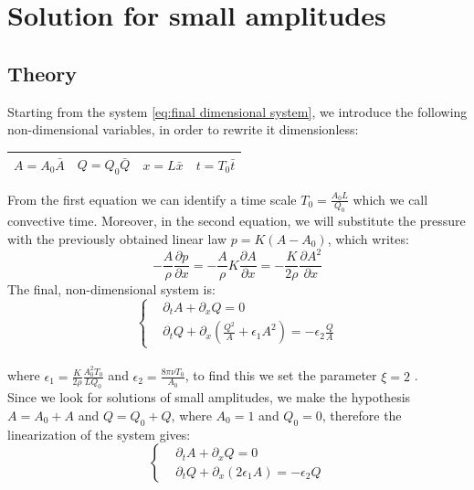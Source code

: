 \documentclass[12pt,a4paper]{article}
\numberwithin{equation}{section}
\begin{document}
\newpage

\section{Solution for small amplitudes}
\label{sec:solution for small amplitudes}
\subsection{Theory}
Starting from the system \ref{eq:final dimensional system}, we introduce the following non-dimensional variables, in order to rewrite it dimensionless:
\begin{center}
 \begin{tabular}{||c c c c||} 
 \hline
 $ A = A_0\bar{A}$ & $Q = Q_0\bar{Q}$ & $x = L\bar{x}$ & $ t = T_0\bar{t}$ \\ [0.5ex] 
 \hline
 \end{tabular}
\end{center}
From the first equation we can identify a time scale $T_0 = \frac{A_0 L}{Q_0}$ which we call convective time. Moreover, in the second equation, we will substitute the pressure with the previously obtained linear law $p = K(A-A_0)$, which writes:
\begin{equation*}
-\frac{A}{\rho}\frac{\partial p}{\partial x} = -\frac{A}{\rho}K\frac{\partial A}{\partial x} = -\frac{K}{2\rho}\frac{\partial A^2}{\partial x}
\end{equation*}
The final, non-dimensional system is:
\begin{equation}\label{adim-system}
  \left\{
      \begin{aligned}
       & \partial_t A + \partial_x Q = 0\\
       & \partial_t Q + \partial_x (\frac{Q^2}{A} + \epsilon_1 A^2) = -\epsilon_2 \frac{Q}{A}
      \end{aligned}
    \right.
\end{equation}\\
where $\epsilon_1 = \frac{K}{2\rho}\frac{A_0^2 T_0}{LQ_0}$ and $\epsilon_2 = \frac{8\pi \nu T_0}{A_0}$, to find this we set the parameter $\xi = 2$ .\\
\linebreak
Since we look for solutions of small amplitudes, we make the hypothesis $A = A_0+A$ and $Q = Q_0 + Q$, where $A_0 = 1$ and $Q_0 = 0$, therefore the linearization of the system gives:
\begin{equation*}
  \left\{
      \begin{aligned}
       & \partial_t A + \partial_x Q = 0\\
       & \partial_t Q + \partial_x (2\epsilon_1 A) = -\epsilon_2 Q
      \end{aligned}
    \right.
\end{equation*}\\
\end{document}
